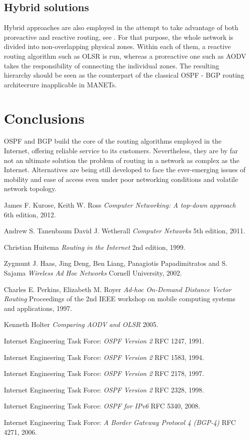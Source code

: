 \documentclass{acm_proc_article-sp}
\begin{document}
\subsection{Hybrid solutions}
Hybrid approaches are also employed in the attempt to take advantage of both proreactive and reactive routing, see \cite{haas}. For that purpose, the whole network is divided into non-overlapping physical zones. Within each of them, a reactive routing algorithm such as OLSR is run, whereas a proreactive one such as AODV takes the responsibility of connecting the individual zones. The resulting hierarchy should be seen as the counterpart of the classical OSPF - BGP routing architecrure inapplicable in MANETs.

\section{Conclusions}

OSPF and BGP build the core of the routing algorithms employed in the Internet, offering reliable service to its customers. Nevertheless, they are by far not an ultimate solution the problem of routing in a network as complex as the Internet. Alternatives are being still developed to face the ever-emerging issues of mobility and ease of access even under poor networking conditions and volatile network topology.

\begin{thebibliography}{1}

   James F. Kurose, Keith W. Ross {\em Computer Networking: A top-down approach}  6th edition, 2012.

    Andrew S. Tanenbaum David J. Wetherall {\em Computer Networks} 5th edition, 2011.

    Christian Huitema {\em Routing in the Internet} 2nd edition, 1999.
  
   Zygmunt J. Haas, Jing Deng, Ben Liang, Panagiotis Papadimitratos and S. Sajama {\em Wireless Ad Hoc Networks } Cornell University, 2002.

    Charles E. Perkins, Elizabeth M. Royer {\em Ad-hoc On-Demand Distance Vector Routing} Proceedings of the 2nd IEEE workshop on mobile computing systems and applications, 1997.
  
   Kenneth Holter {\em Comparing AODV and OLSR} 2005. 

   Internet Engineering Task Force: {\em OSPF Version 2} RFC 1247, 1991.
  
   Internet Engineering Task Force: {\em OSPF Version 2} RFC 1583, 1994.
  
   Internet Engineering Task Force: {\em OSPF Version 2} RFC 2178, 1997.
  
   Internet Engineering Task Force: {\em OSPF Version 2} RFC 2328, 1998.
  
   Internet Engineering Task Force: {\em OSPF for IPv6} RFC 5340, 2008.
  
   Internet Engineering Task Force: {\em A Border Gateway Protocol 4 (BGP-4)} RFC 4271, 2006.
  
  \end{thebibliography}
\end{document}
